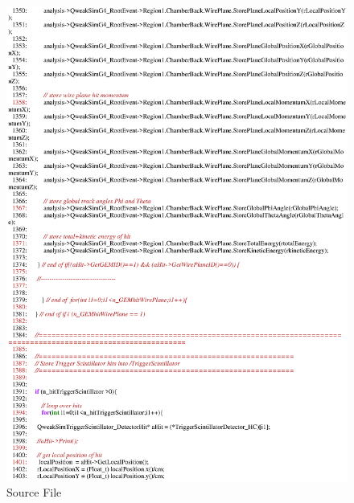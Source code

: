 \begin{figure}[h]
  \hspace{0cm}
  \includegraphics[scale=0.8]{./figures13/QweakSimEventAction.cc-p24.eps}
  \caption{Source File}
           \label{fig:XIII-SC-39}
\end{figure}

\clearpage

